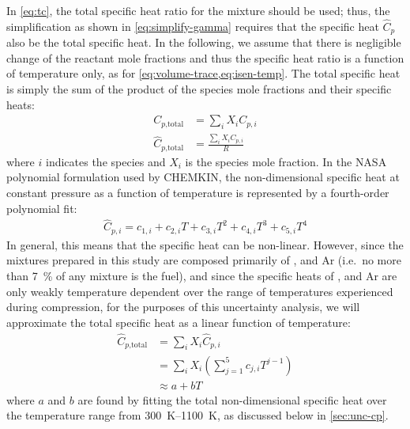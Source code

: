 \documentclass[../main.tex]{subfiles}
\begin{document}
In \cref{eq:tc}, the total specific heat ratio for the mixture
should be used; thus, the simplification as shown in \cref{eq:simplify-gamma}
requires that the specific heat $\hat{C}_p$ also be the total specific
heat. In the following, we assume that there is negligible
change of the reactant mole fractions and thus the specific heat ratio
is a function of temperature only, as for \cref{eq:volume-trace,eq:isen-temp}.
The total specific heat is simply the sum of the product of
the species mole fractions and their specific heats:
%
\begin{subequations}
\label{eq:cp}
\begin{align}
C_{p\text{,total}} &= \sum_i X_i C_{p,i} \\
\hat{C}_{p\text{,total}} &= \frac{\sum_i X_i C_{p,i}}{R}
\end{align}
\end{subequations}
%
where $i$ indicates the species and $X_i$ is the species mole fraction.
In the NASA polynomial formulation used by CHEMKIN, the non-dimensional specific
heat at constant pressure as a function of temperature is represented by a
fourth-order polynomial fit:
%
\begin{align}
\label{eq:cp-nasa}
\hat{C}_{p,i} = c_{1,i} + c_{2,i} T + c_{3,i} T^2 + c_{4,i} T^3 + c_{5,i} T^4
\end{align}
%
In general, this means that the specific heat can be non-linear. However,
since the mixtures prepared in this study are composed primarily of
,  and Ar (i.e.\ no more than \SI{7}{\percent} of any mixture is the
fuel), and since the specific heats of ,  and Ar are only weakly
temperature dependent over the range of temperatures experienced during
compression, for the purposes of this uncertainty analysis, we will
approximate the total specific heat as a linear function of temperature:
%
\begin{equation}
\label{eq:cp-total}
\begin{split}
\hat{C}_{p\text{,total}} &= \sum_i X_i \hat{C}_{p,i} \\
&= \sum_i X_i \left( \sum_{j=1}^5 c_{j,i} T^{j-1} \right) \\
&\approx a + b T
\end{split}
\end{equation}
%
where $a$ and $b$ are found by fitting the total non-dimensional specific heat
over the temperature range from \SIrange{300}{1100}{\kelvin}, as
discussed below in \cref{sec:unc-cp}.
\end{document}

